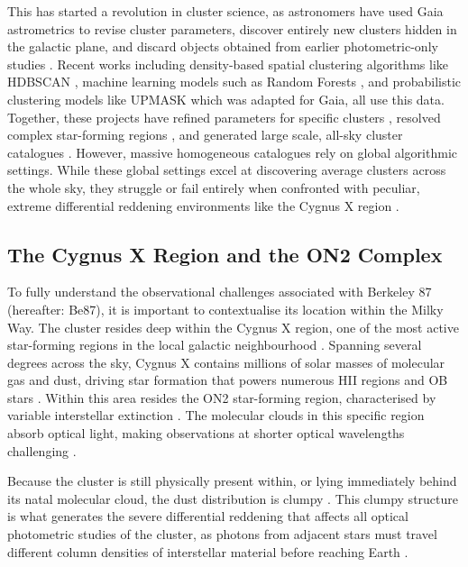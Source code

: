 \documentclass{CU_IOPStyle_PXT999}
\begin{document}
This has started a revolution in cluster science, as astronomers have used Gaia astrometrics to revise cluster parameters, discover entirely new clusters hidden in the galactic plane, and discard objects obtained from earlier photometric-only studies \cite{cantat-gaudin_gaia_2018}. Recent works including density-based spatial clustering algorithms like HDBSCAN \cite{hunt_improving_2023}, machine learning models such as Random Forests \cite{Mahmudunnobe_2021}, and probabilistic clustering models like UPMASK \cite{krone-martins_upmask_2014} which was adapted for Gaia, all use this data. Together, these projects have refined parameters for specific clusters \cite{bisht_deep_2021, koc_photometric_2022}, resolved complex star-forming regions \cite{de_la_fuente_clustered_2021}, and generated large scale, all-sky cluster catalogues \cite{cantat-gaudin_painting_2020}. However, massive homogeneous catalogues rely on global algorithmic settings. While these global settings excel at discovering average clusters across the whole sky, they struggle or fail entirely when confronted with peculiar, extreme differential reddening environments like the Cygnus X region \cite{hunt_improving_2023, de_la_fuente_clustered_2021}. 

\subsection{The Cygnus X Region and the ON2 Complex}
\label{ssec:1.4}
To fully understand the observational challenges associated with Berkeley 87 (hereafter: Be87), it is important to contextualise its location within the Milky Way. The cluster resides deep within the Cygnus X region, one of the most active star-forming regions in the local galactic neighbourhood \cite{reipurth_2008}. Spanning several degrees across the sky, Cygnus X contains millions of solar masses of molecular gas and dust, driving star formation that powers numerous HII regions and OB stars \cite{de_la_fuente_clustered_2021}. Within this area resides the ON2 star-forming region, characterised by variable interstellar extinction \cite{WEBDA}. The molecular clouds in this specific region absorb optical light, making observations at shorter optical wavelengths challenging \cite{Cardelli_1989}. 

Because the cluster is still physically present within, or lying immediately behind its natal molecular cloud, the dust distribution is clumpy \cite{lada_embedded_2003, de_la_fuente_clustered_2021}. This clumpy structure is what generates the severe differential reddening that affects all optical photometric studies of the cluster, as photons from adjacent stars must travel different column densities of interstellar material before reaching Earth \cite{de_la_fuente_clustered_2021}. 
\end{document}
